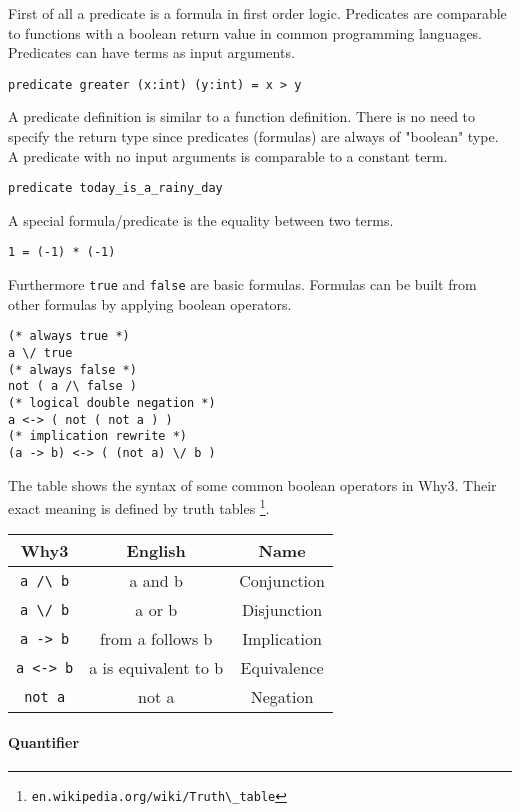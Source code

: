 First of all a predicate is a formula in first order logic.
Predicates are comparable to functions with a boolean return value in 
common programming languages. Predicates can have terms as input arguments.
\begin{lstlisting}
predicate greater (x:int) (y:int) = x > y
\end{lstlisting}
A predicate definition is similar to a function definition. There is no
need to specify the return type since predicates (formulas) are always of
"boolean" type.
A predicate with no input arguments is comparable to a constant term.
\begin{lstlisting}
predicate today_is_a_rainy_day
\end{lstlisting}
A special formula/predicate is the equality between two terms.
\begin{lstlisting}
1 = (-1) * (-1)
\end{lstlisting}
Furthermore \verb"true" and \verb"false" are basic formulas. Formulas can be built
from other formulas by applying boolean operators.
\begin{lstlisting}
(* always true *)
a \/ true
(* always false *)
not ( a /\ false )
(* logical double negation *)
a <-> ( not ( not a ) )
(* implication rewrite *)
(a -> b) <-> ( (not a) \/ b )
\end{lstlisting}
The table shows the syntax of some common boolean operators in Why3.
Their exact meaning is defined by truth tables \footnote{\verb"en.wikipedia.org/wiki/Truth\_table"}.

\begin{tabular} {c|c|c}
Why3 & English & Name \\
\hline
\verb"a /\ b" & a and b & Conjunction \\
\verb"a \/ b" & a or b & Disjunction \\
\verb"a -> b" & from a follows b & Implication \\
\verb"a <-> b" & a is equivalent to b & Equivalence \\
\verb"not a" & not a & Negation \\
\end{tabular}

\paragraph{Quantifier}

